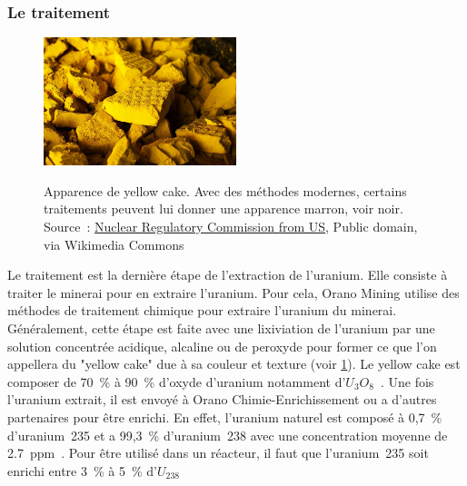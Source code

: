 \subsubsection{Le traitement}
\begin{figure}
    \centering
    \href{https://commons.wikimedia.org/wiki/File:Yellow_Cake_Uranium_(14492248719).jpg}{\includegraphics[width=0.5\textwidth]{img/Yellow_Cake_Uranium_(14492248719).jpg}}
    \caption[Apparence du yellow cake]{Apparence de yellow cake. Avec des méthodes modernes, certains traitements peuvent lui donner une apparence marron, voir noir. Source~: \href{https://commons.wikimedia.org/wiki/File:Yellow_Cake_Uranium_(14492248719).jpg}{Nuclear Regulatory Commission from US}, Public domain, via Wikimedia Commons}
    \label{fig_yellow-cake}
\end{figure}

Le traitement est la dernière étape de l'extraction de l'uranium. Elle consiste à traiter le minerai pour en extraire l'uranium. Pour cela, Orano Mining utilise des méthodes de traitement chimique pour extraire l'uranium du minerai. Généralement, cette étape est faite avec une lixiviation de l'uranium par une solution concentrée acidique, alcaline ou de peroxyde pour former ce que l'on appellera du "yellow cake" due à sa couleur et texture (voir \cref{fig_yellow-cake}). Le yellow cake est composer de 70~\% à 90~\% d'oxyde d'uranium notamment d'$U_3O_8$~\cite{article:composition-yellow-cake}. Une fois l'uranium extrait, il est envoyé à Orano Chimie-Enrichissement ou a d'autres partenaires pour être enrichi. En effet, l'uranium naturel est composé à 0,7~\% d'uranium~235 et a 99,3~\% d'uranium~238 avec une concentration moyenne de 2.7~ppm~\cite{site:natural_uranium}. Pour être utilisé dans un réacteur, il faut que l'uranium~235 soit enrichi entre 3~\% à 5~\% d'$U_{238}$~\cite{article:uranium-concentration}



